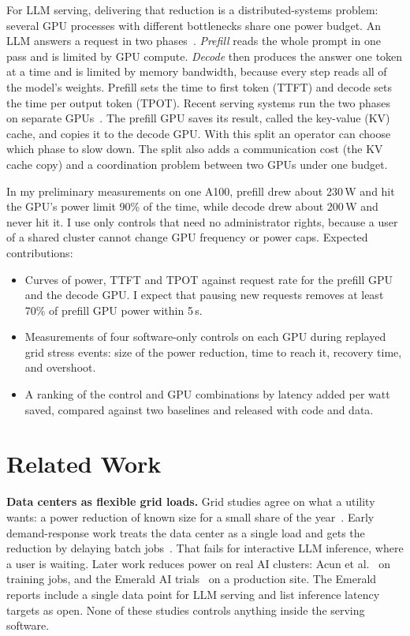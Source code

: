 \documentclass[conference,10pt]{IEEEtran}
\begin{document}
For LLM serving, delivering that reduction is a distributed-systems problem: several GPU processes with different bottlenecks share one power budget. An LLM answers a request in two phases~\cite{patel2024splitwise}. \emph{Prefill} reads the whole prompt in one pass and is limited by GPU compute. \emph{Decode} then produces the answer one token at a time and is limited by memory bandwidth, because every step reads all of the model's weights. Prefill sets the time to first token (TTFT) and decode sets the time per output token (TPOT). Recent serving systems run the two phases on separate GPUs~\cite{zhong2024distserve,qin2025mooncake}. The prefill GPU saves its result, called the key-value (KV) cache, and copies it to the decode GPU. With this split an operator can choose which phase to slow down. The split also adds a communication cost (the KV cache copy) and a coordination problem between two GPUs under one budget.

In my preliminary measurements on one A100, prefill drew about 230\,W and hit the GPU's power limit 90\% of the time, while decode drew about 200\,W and never hit it. I use only controls that need no administrator rights, because a user of a shared cluster cannot change GPU frequency or power caps. Expected contributions:
\begin{itemize}
\item Curves of power, TTFT and TPOT against request rate for the prefill GPU and the decode GPU. I expect that pausing new requests removes at least 70\% of prefill GPU power within 5\,s.
\item Measurements of four software-only controls on each GPU during replayed grid stress events: size of the power reduction, time to reach it, recovery time, and overshoot.
\item A ranking of the control and GPU combinations by latency added per watt saved, compared against two baselines and released with code and data.
\end{itemize}

\section{Related Work}
\textbf{Data centers as flexible grid loads.} Grid studies agree on what a utility wants: a power reduction of known size for a small share of the year~\cite{norris2025rethinking,khanal2026shift}. Early demand-response work treats the data center as a single load and gets the reduction by delaying batch jobs~\cite{wierman2014dcdr,liu2013dcdr,lin2023adapting}. That fails for interactive LLM inference, where a user is waiting. Later work reduces power on real AI clusters: Acun et al.~\cite{acun2026flexdc} on training jobs, and the Emerald AI trials~\cite{colangelo2025phoenix,williams2026powerflex} on a production site. The Emerald reports include a single data point for LLM serving and list inference latency targets as open. None of these studies controls anything inside the serving software.
\end{document}
